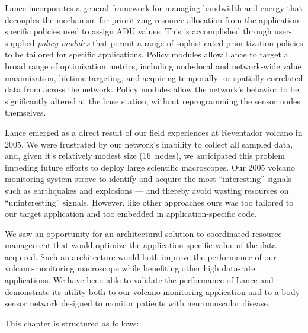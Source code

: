 Lance incorporates a general framework for managing bandwidth and energy that
decouples the mechanism for prioritizing resource allocation from the
application-specific policies used to assign ADU values. This is accomplished
through user-supplied \textit{policy modules} that permit a range of
sophisticated prioritization policies to be tailored for specific
applications. Policy modules allow Lance to target a broad range of
optimization metrics, including node-local and network-wide value
maximization, lifetime targeting, and acquiring temporally- or
spatially-correlated data from across the network. Policy modules allow the
network's behavior to be significantly altered at the base station, without
reprogramming the sensor nodes themselves.

Lance emerged as a direct result of our field experiences at Reventador
volcano in 2005. We were frustrated by our network's inability to collect all
sampled data, and, given it's relatively modest size (16~nodes), we
anticipated this problem impeding future efforts to deploy large scientific
macroscopes. Our 2005 volcano monitoring system strove to identify and
acquire the most ``interesting'' signals --- such as earthquakes and
explosions --- and thereby avoid wasting resources on ``uninteresting''
signals. However, like other approaches ours was too tailored to our target
application and too embedded in application-specific code.

We saw an opportunity for an architectural solution to coordinated resource
management that would optimize the application-specific value of the data
acquired. Such an architecture would both improve the performance of our
volcano-monitoring macroscope while benefiting other high data-rate
applications. We have been able to validate the performance of Lance and
demonstrate its utility both to our volcano-monitoring application and to a
body sensor network designed to monitor patients with neuromuscular disease.

This chapter is structured as follows:

